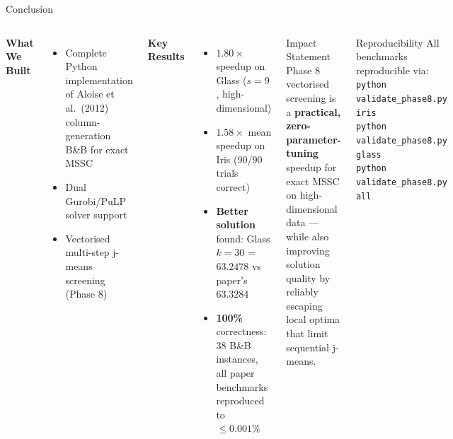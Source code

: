 \documentclass[aspectratio=169,12pt]{beamer}
\begin{document}
\begin{frame}{Conclusion}
  \begin{columns}[T]
      \textbf{What We Built}
      \begin{itemize}
        \item Complete Python implementation of Aloise et al.\ (2012) column-generation B\&B for exact MSSC
        \item Dual Gurobi/PuLP solver support
        \item Vectorised multi-step j-means screening (Phase 8)
      \end{itemize}

      \vspace{0.4em}
      \textbf{Key Results}
      \begin{itemize}
        \item $\mathbf{1.80\times}$ speedup on Glass ($s=9$, high-dimensional)
        \item $\mathbf{1.58\times}$ mean speedup on Iris (90/90 trials correct)
        \item \textbf{Better solution} found: Glass $k=30$ = $\mathbf{63.2478}$ vs paper's $63.3284$
        \item \textbf{100\%} correctness: 38 B\&B instances, all paper benchmarks reproduced to $\leq 0.001\%$
      \end{itemize}

      \begin{alertblock}{Impact Statement}
        Phase 8 vectorised screening is a \textbf{practical, zero-parameter-tuning} speedup for exact MSSC on high-dimensional data — while also improving solution quality by reliably escaping local optima that limit sequential j-means.
      \end{alertblock}

      \vspace{0.4em}
      \begin{block}{Reproducibility}
        All benchmarks reproducible via:\\[2pt]
        \texttt{\small python validate\_phase8.py iris}\\
        \texttt{\small python validate\_phase8.py glass}\\
        \texttt{\small python validate\_phase8.py all}
      \end{block}
  \end{columns}
\end{frame}
\end{document}
